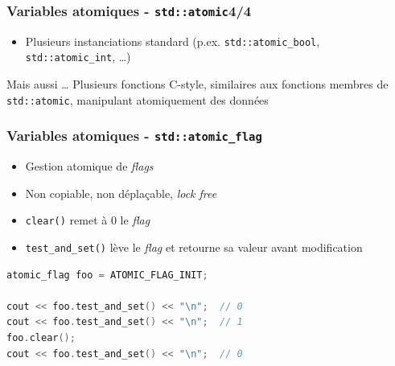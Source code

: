 \documentclass[C++.tex]{subfiles}
\begin{document}
\begin{frame}[fragile]
	\frametitle{Variables atomiques - \lstinline|std::atomic|\titlehfill{}4/4}
	\begin{itemize}
		\item Plusieurs instanciations standard (p.ex. \lstinline|std::atomic_bool|, \lstinline|std::atomic_int|, \ldots)
	\end{itemize}

	\begin{block}{Mais aussi \ldots}
		Plusieurs fonctions \og C-style\fg{}, similaires aux fonctions membres de \lstinline|std::atomic|, manipulant atomiquement des données
	\end{block}
\end{frame}

\begin{frame}[fragile]
	\frametitle{Variables atomiques - \lstinline|std::atomic_flag|}
	\begin{itemize}
		\item Gestion atomique de \textit{flags}
		\item Non copiable, non déplaçable, \textit{lock free}
		\item \lstinline|clear()| remet à 0 le \textit{flag}
		\item \lstinline|test_and_set()| lève le \textit{flag} et retourne sa valeur avant modification
	\end{itemize}

	\begin{lstlisting}[language=C++]
atomic_flag foo = ATOMIC_FLAG_INIT;

cout << foo.test_and_set() << "\n";  // 0
cout << foo.test_and_set() << "\n";  // 1
foo.clear();
cout << foo.test_and_set() << "\n";  // 0\end{lstlisting}
\end{frame}
\end{document}
